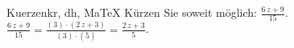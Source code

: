 \begin{MAufgabe}{Kuerzen}{kr, dh, MaTeX}
K\"urzen Sie soweit m\"oglich: $\frac{6\, z + 9}{15}$.\\ 
\ifLsg\MLoesung
\quad $\frac{6\, z + 9}{15}=\frac{(3)\cdot(2\, z + 3)}{(3)\cdot(5)}=\frac{2\, z + 3}{5}$.\else\relax\fi
 \end{MAufgabe}